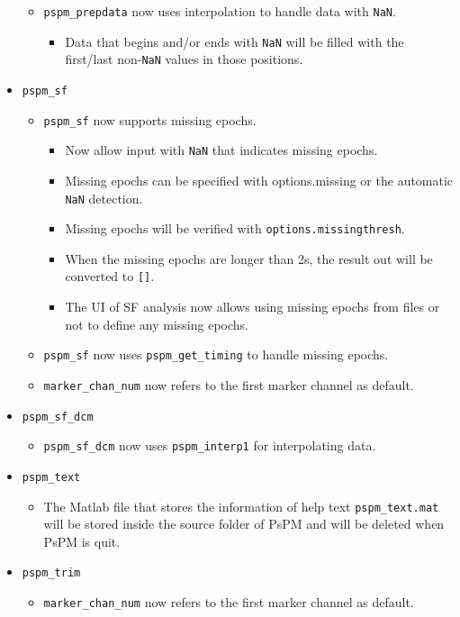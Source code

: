 \documentclass[english]{article}
\numberwithin{equation}{section}
\numberwithin{figure}{section}
\begin{document}
\begin{itemize}
    	\begin{itemize}
    		\item \texttt{pspm\_prepdata} now uses interpolation to handle data with \texttt{NaN}.
    		\begin{itemize}
    		\item Data that begins and/or ends with \texttt{NaN} will be filled with the first/last non-\texttt{NaN} values in those positions.
    		\end{itemize}
    	\end{itemize}
    	\item \texttt{pspm\_sf}
    	\begin{itemize}
    		\item \texttt{pspm\_sf} now supports missing epochs.
    		\begin{itemize}
    			\item Now allow input with \texttt{NaN} that indicates missing epochs. 
    			\item Missing epochs can be specified with options.missing or the automatic \texttt{NaN} detection. 
    			\item Missing epochs will be verified with \texttt{options.missingthresh}. 
    			\item When the missing epochs are longer than 2s, the result out will be converted to \texttt{[]}.
    			\item The UI of SF analysis now allows using missing epochs from files or not to define any missing epochs.
    		\end{itemize}
    		\item \texttt{pspm\_sf} now uses \texttt{pspm\_get\_timing} to handle missing epochs.
    		\item \texttt{marker\_chan\_num} now refers to the first marker channel as default.
    	\end{itemize}
    	\item \texttt{pspm\_sf\_dcm}
    	\begin{itemize}
    		\item \texttt{pspm\_sf\_dcm} now uses \texttt{pspm\_interp1} for interpolating data.
    	\end{itemize}
    	\item \texttt{pspm\_text}
    	\begin{itemize}
    		\item The Matlab file that stores the information of help text \texttt{pspm\_text.mat} will be stored inside the source folder of PsPM and will be deleted when PsPM is quit.
    	\end{itemize}
    	\item \texttt{pspm\_trim}
    	\begin{itemize}
    		\item \texttt{marker\_chan\_num} now refers to the first marker channel as default.
    	\end{itemize}
    \end{itemize}
    
\end{document}
